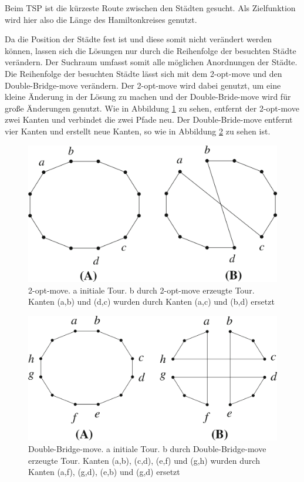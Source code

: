 \documentclass[conference]{IEEEtran}
\begin{document}
      Beim TSP ist die kürzeste Route zwischen den Städten gesucht. Als Zielfunktion wird hier also 
      die Länge des Hamiltonkreises genutzt. 

      Da die Position der Städte fest ist und diese somit nicht verändert werden können, lassen sich 
      die Lösungen nur durch die Reihenfolge der besuchten Städte verändern. Der Suchraum umfasst somit alle 
      möglichen Anordnungen der Städte. Die Reihenfolge der besuchten Städte lässt sich mit dem 2-opt-move \cite{b10} 
      und den Double-Bridge-move \cite{b10} verändern. Der 2-opt-move wird dabei genutzt, um eine kleine Änderung 
      in der Lösung zu machen und der Double-Bride-move wird für große Änderungen genutzt. Wie 
      in Abbildung \ref{fig:2-opt-move} zu sehen, entfernt der 2-opt-move zwei Kanten und verbindet die zwei 
      Pfade neu. Der Double-Bride-move entfernt vier Kanten und erstellt neue Kanten, so wie in 
      Abbildung \ref{fig:double-bridge-move} zu sehen ist.

      \begin{figure}
      \centering
        \includegraphics[width=0.8\linewidth]{2-opt-move.png}
        \caption{2-opt-move. a initiale Tour. b durch 2-opt-move erzeugte Tour. Kanten (a,b) und (d,c) wurden durch Kanten (a,c) und (b,d) ersetzt}
        \label{fig:2-opt-move}
      \end{figure}

      \begin{figure}
      \centering
        \includegraphics[width=0.8\linewidth]{double-Bridge.png}
        \caption{Double-Bridge-move. a initiale Tour. b durch Double-Bridge-move erzeugte Tour. Kanten 
        (a,b), (c,d), (e,f) und (g,h) wurden durch Kanten (a,f), (g,d), (e,b) und (g,d) ersetzt}
        \label{fig:double-bridge-move}
      \end{figure}
\end{document}
